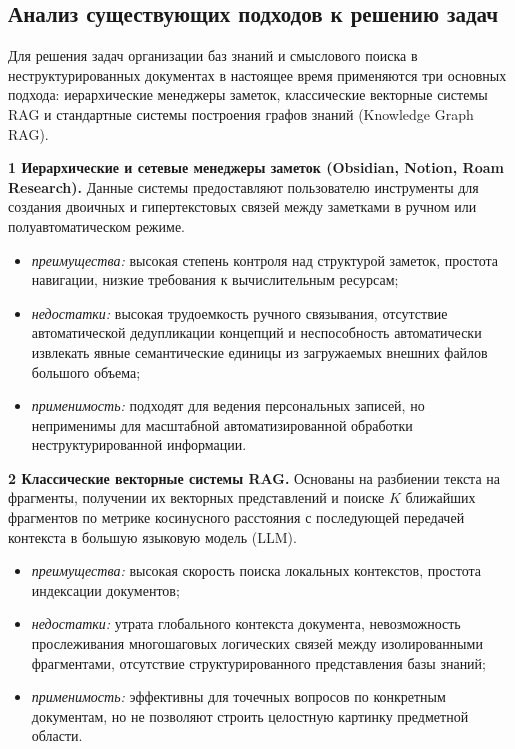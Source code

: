 \subsection{Анализ существующих подходов к решению задач}

Для решения задач организации баз знаний и смыслового поиска в неструктурированных документах в настоящее время применяются три основных подхода: иерархические менеджеры заметок, классические векторные системы RAG и стандартные системы построения графов знаний (Knowledge Graph RAG).


    \textbf{1 Иерархические и сетевые менеджеры заметок (Obsidian, Notion, Roam Research).}
    Данные системы предоставляют пользователю инструменты для создания двоичных и гипертекстовых связей между заметками в ручном или полуавтоматическом режиме.
    \begin{itemize}
        \item \textit{преимущества:} высокая степень контроля над структурой заметок, простота навигации, низкие требования к вычислительным ресурсам;
        \item \textit{недостатки:} высокая трудоемкость ручного связывания, отсутствие автоматической дедупликации концепций и неспособность автоматически извлекать явные семантические единицы из загружаемых внешних файлов большого объема;
        \item \textit{применимость:} подходят для ведения персональных записей, но неприменимы для масштабной автоматизированной обработки неструктурированной информации.
    \end{itemize}

    \textbf{2 Классические векторные системы RAG.}
    Основаны на разбиении текста на фрагменты, получении их векторных представлений и поиске $K$ ближайших фрагментов по метрике косинусного расстояния с последующей передачей контекста в большую языковую модель (LLM).
    \begin{itemize}
        \item \textit{преимущества:} высокая скорость поиска локальных контекстов, простота индексации документов;
        \item \textit{недостатки:} утрата глобального контекста документа, невозможность прослеживания многошаговых логических связей между изолированными фрагментами, отсутствие структурированного представления базы знаний;
        \item \textit{применимость:} эффективны для точечных вопросов по конкретным документам, но не позволяют строить целостную картинку предметной области.
    \end{itemize}

